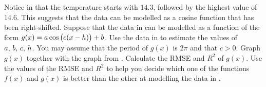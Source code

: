 \documentclass[a4paper,oneside,12pt]{article}
\begin{document}
\begin{exercise}
\begin{packedenum}
\item\label{subex:trigonometric:mean_min_temperature_cos_right_shift}
  Notice in  that the
  temperature starts with $14.3$, followed by the highest value of
  $14.6$.  This suggests that the data can be modelled as a cosine
  function that has been right-shifted.  Suppose that the data in
   can be modelled as a
  function of the form $g(x) = a \cos\big(c(x - h)\big) + b$.  Use
  the data in  to
  estimate the values of ${a},\, {b},\, {c},\, {h}$.  You may assume
  that the period of $g(x)$ is $2\pi$ and that $c > 0$.  Graph $g(x)$
  together with the graph
  from .  Calculate
  the RMSE and $R^2$ of $g(x)$.  Use the values of the RMSE and $R^2$
  to help you decide which one of the functions $f(x)$ and $g(x)$ is
  better than the other at modelling the data in
  .
\end{packedenum}
\end{exercise}
\end{document}
